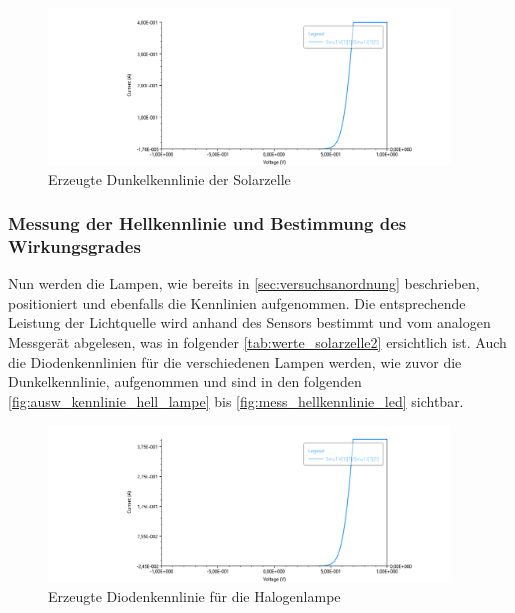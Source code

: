 \documentclass[12pt,english,ngerman]{scrartcl}
\begin{document}
\begin{figure}[H]
	\centering
	\includegraphics[width=0.95\textwidth]{figures/dunekl.png}
	\caption{Erzeugte Dunkelkennlinie der Solarzelle
	}\label{fig:mess_dunkelkennlinie}
\end{figure}

\subsubsection{Messung der Hellkennlinie und Bestimmung des Wirkungsgrades}

Nun werden die Lampen, wie bereits in \autoref{sec:versuchsanordnung}
beschrieben, positioniert und ebenfalls die Kennlinien aufgenommen. Die
entsprechende Leistung der Lichtquelle wird anhand des Sensors bestimmt und vom
analogen Messgerät abgelesen, was in folgender \autoref{tab:werte_solarzelle2}
ersichtlich ist. Auch die Diodenkennlinien für die verschiedenen Lampen werden,
wie zuvor die Dunkelkennlinie, aufgenommen und sind in den folgenden
\autoref{fig:ausw_kennlinie_hell_lampe} bis
\autoref{fig:mess_hellkennlinie_led} sichtbar.


\begin{figure}[H]
	\centering
	\includegraphics[width=0.95\textwidth]{figures/helllampe.png}
	\caption{Erzeugte Diodenkennlinie für die Halogenlampe
	}\label{fig:mess_hellkennlinie_lampe}
\end{figure}
\end{document}
